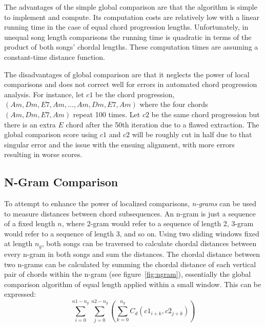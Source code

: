 The advantages of the simple global comparison are that the algorithm is simple to implement and compute. Its computation costs are relatively low with a linear running time in the case of equal chord progression lengths. Unfortunately, in unequal song length comparisons the running time is quadratic in terms of the product of both songs' chordal lengths. These computation times are assuming a constant-time distance function.

The disadvantages of global comparison are that it neglects the power of local comparisons and does not correct well for errors in automated chord progression analysis. For instance, let ${c1}$ be the chord progression, $(Am, Dm, E7, Am, ... , Am, Dm, E7, Am)$ where the four chords $(Am, Dm, E7, Am)$ repeat 100 times. Let ${c2}$ be the same chord progression but there is an extra $E$ chord after the 50th iteration due to a flawed extraction. The global comparison score using ${c1}$ and ${c2}$ will be roughly cut in half due to that singular error and the issue with the ensuing alignment, with more errors resulting in worse scores.

\subsection{N-Gram Comparison}

To attempt to enhance the power of localized comparisons, \textit{n-grams} can be used to measure distances between chord subsequences. An n-gram is just a sequence of a fixed length $n$, where 2-gram would refer to a sequence of length 2, 3-gram would refer to a sequence of length 3, and so on. Using two sliding windows fixed at length $n_g$, both songs can be traversed to calculate chordal distances between every n-gram in both songs and sum the distances. The chordal distance between two n-grams can be calculated by summing the chordal distance of each vertical pair of chords within the n-gram (see figure~\ref{fig:ngram}), essentially the global comparison algorithm of equal length applied within a small window. This can be expressed: \[\sum_{i=0}^{n1 - n_g} \sum_{j=0}^{n2 - n_g} \left( \sum_{k=0}^{n_g} C_d({c1}_{i+k}, {c2}_{j+k}) \right) \]